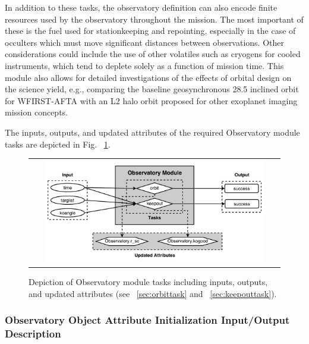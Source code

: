 \documentclass[cleanfoot]{asme2ej}
\begin{document}
In addition to these tasks, the observatory definition can also encode finite resources used by the observatory throughout the mission.  The most important of these is the fuel used for stationkeeping and repointing, especially in the case of occulters which must move significant distances between observations.  Other considerations could include the use of other volatiles such as cryogens for cooled instruments, which tend to deplete solely as a function of mission time.  This module also allows for detailed investigations of the effects of orbital design on the science yield, e.g., comparing the baseline geosynchronous 28.5\textdegree{} inclined orbit for WFIRST-AFTA with an L2 halo orbit proposed for other exoplanet imaging mission concepts. 

The inputs, outputs, and updated attributes of the required Observatory module tasks are depicted in Fig. ~\ref{fig:observatorymodule}.

\begin{figure}[ht]
    \begin{center}
        \begin{tabular}{c}
             \includegraphics[width=0.9\textwidth]{observatory3}
        \end{tabular}
    \end{center}
    \caption{\label{fig:observatorymodule} Depiction of Observatory module tasks including inputs, outputs, and updated attributes (see ~\ref{sec:orbittask} and ~\ref{sec:keepouttask}).}
\end{figure}

\label{sec:observatory}
\subsubsection{Observatory Object Attribute Initialization Input/Output Description}
\end{document}
